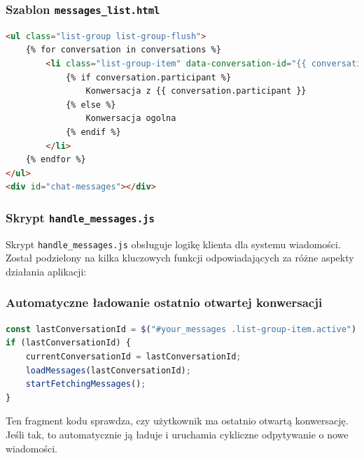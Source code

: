 \documentclass[12pt,a4paper,oneside]{article}
\theoremstyle{definition}
\numberwithin{equation}{section}
\begin{document}
\subsubsection{Szablon \texttt{messages\_list.html}}

\begin{lstlisting}[language=HTML, caption=Szablon \texttt{messages\_list.html}]
<ul class="list-group list-group-flush">
    {% for conversation in conversations %}
        <li class="list-group-item" data-conversation-id="{{ conversation.id }}">
            {% if conversation.participant %}
                Konwersacja z {{ conversation.participant }}
            {% else %}
                Konwersacja ogolna
            {% endif %}
        </li>
    {% endfor %}
</ul>
<div id="chat-messages"></div>
\end{lstlisting}


\subsubsection{Skrypt \texttt{handle\_messages.js}}
Skrypt \texttt{handle\_messages.js} obsługuje logikę klienta dla systemu wiadomości. Został podzielony na kilka kluczowych funkcji odpowiadających za różne aspekty działania aplikacji:



\subsubsection*{Automatyczne ładowanie ostatnio otwartej konwersacji}
\begin{lstlisting}[language=JavaScript, caption=Automatyczne ładowanie ostatnio otwartej konwersacji]
const lastConversationId = $("#your_messages .list-group-item.active").data("conversation-id");
if (lastConversationId) {
    currentConversationId = lastConversationId;
    loadMessages(lastConversationId);
    startFetchingMessages();
}
\end{lstlisting}
Ten fragment kodu sprawdza, czy użytkownik ma ostatnio otwartą konwersację. Jeśli tak, to automatycznie ją ładuje i uruchamia cykliczne odpytywanie o nowe wiadomości.
\end{document}
